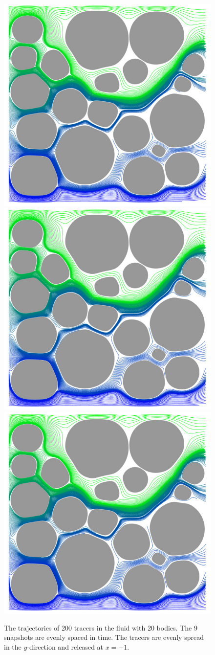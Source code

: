 \documentclass[preprint, 10pt]{elsarticle}
\begin{document}
\begin{figure}[H]
\begin{center}
\includegraphics[width = 0.32 \textwidth]{./figs/tracer_20b210}
\includegraphics[width = 0.32 \textwidth]{./figs/tracer_20b240}
\includegraphics[width = 0.32 \textwidth]{./figs/tracer_20b270}
\caption{\label{fig:Eroding20tracer}The trajectories of 200 tracers in
  the fluid with 20 bodies. The 9 snapshots are evenly spaced in time.
  The tracers are evenly spread in the $y$-direction and released at
  $x=-1$.}
\end{center}
\end{figure}
\end{document}
